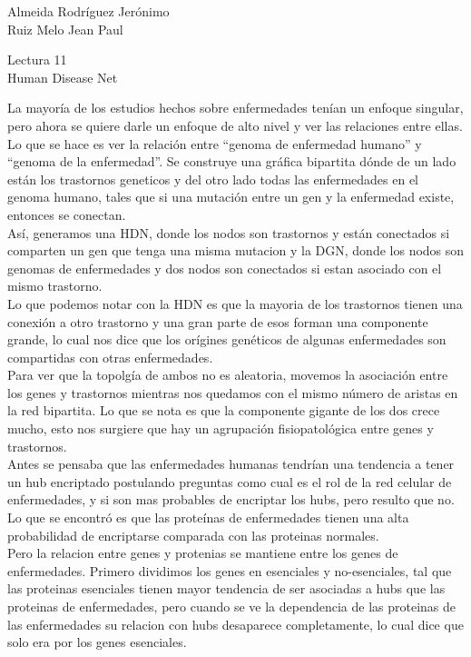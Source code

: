 \documentclass[a4paper, 12pt]{report}
\begin{document}
\begin{flushright}
    Almeida Rodríguez Jerónimo\\
    Ruiz Melo Jean Paul
\end{flushright}

\begin{center}
    {\LARGE Lectura 11}\\
    {\LARGE Human Disease Net}
\end{center}

La mayoría de los estudios hechos sobre enfermedades tenían un enfoque singular,
pero ahora se quiere darle un enfoque de alto nivel y ver las relaciones entre
ellas. Lo que se hace es ver la relación entre ``genoma de enfermedad humano'' y
``genoma de la enfermedad''. Se construye una gráfica bipartita dónde de un lado
están los trastornos geneticos y del otro lado todas las enfermedades en el
genoma humano, tales que si una mutación entre un gen y la enfermedad existe,
entonces se conectan.  \\

Así, generamos una HDN, donde los nodos son trastornos y están conectados
si comparten un gen que tenga una misma mutacion y la DGN,
donde los nodos son genomas de enfermedades y dos nodos son conectados
si estan asociado con el mismo trastorno. \\

Lo que podemos notar con la HDN es que la mayoria de los trastornos tienen una conexión
a otro trastorno y una gran parte de esos forman una componente grande, lo cual
nos dice que los orígines genéticos de algunas enfermedades son compartidas con
otras enfermedades.  \\

Para ver que la topolgía de ambos no es aleatoria, movemos la asociación entre
los genes y trastornos mientras nos quedamos con el mismo número de aristas en
la red bipartita. Lo que se nota es que la componente gigante de los dos crece mucho,
esto nos surgiere que hay un agrupación fisiopatológica entre genes y
trastornos. \\

Antes se pensaba que las enfermedades humanas tendrían una tendencia a tener un
hub encriptado postulando preguntas como cual es el
rol de la red celular de enfermedades, y si son mas probables de encriptar
los hubs, pero resulto que no. Lo que se encontró es que las proteínas de
enfermedades tienen una alta
probabilidad de encriptarse comparada con las proteinas normales.\\

Pero la relacion entre genes y protenias se mantiene entre los genes de enfermedades.
Primero dividimos los genes en esenciales y no-esenciales, tal que las proteinas
esenciales tienen mayor tendencia de ser asociadas a hubs que las proteinas de enfermedades,
pero cuando se ve la dependencia de las proteinas de las enfermedades su relacion con hubs
desaparece completamente, lo cual dice que solo era por los genes esenciales. \\
\end{document}
